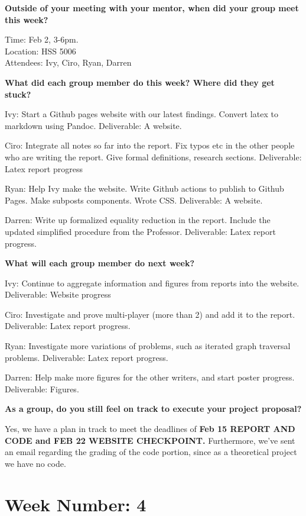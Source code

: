 \textbf{Outside of your meeting with your mentor, when did your group
meet this week?}

Time: Feb 2, 3-6pm.\\
Location: HSS 5006\\
Attendees: Ivy, Ciro, Ryan, Darren

\textbf{What did each group member do this week? Where did they get
stuck?}

Ivy: Start a Github pages website with our latest findings. Convert
latex to markdown using Pandoc. Deliverable: A website.

Ciro: Integrate all notes so far into the report. Fix typos etc in the
other people who are writing the report. Give formal definitions,
research sections. Deliverable: Latex report progress

Ryan: Help Ivy make the website. Write Github actions to publish to
Github Pages. Make subposts components. Wrote CSS. Deliverable: A
website.

Darren: Write up formalized equality reduction in the report. Include
the updated simplified procedure from the Professor. Deliverable: Latex
report progress.

\textbf{What will each group member do next week?}

Ivy: Continue to aggregate information and figures from reports into the
website. Deliverable: Website progress

Ciro: Investigate and prove multi-player (more than 2) and add it to the
report. Deliverable: Latex report progress.

Ryan: Investigate more variations of problems, such as iterated graph
traversal problems. Deliverable: Latex report progress.

Darren: Help make more figures for the other writers, and start poster
progress. Deliverable: Figures.

\textbf{As a group, do you still feel on track to execute your project
proposal?}

Yes, we have a plan in track to meet the deadlines of \textbf{Feb 15
REPORT AND CODE and FEB 22 WEBSITE CHECKPOINT.} Furthermore, we've sent
an email regarding the grading of the code portion, since as a
theoretical project we have no code.

\section{\texorpdfstring{\textbf{Week Number:
4}}{Week Number: 4}}\label{week-number-4}

